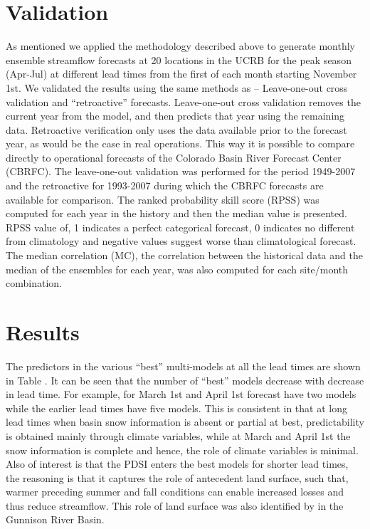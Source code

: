 \documentclass[final,5p,times,twocolumn,authoryear]{elsarticle}
\begin{document}
\section{Validation}

As mentioned we applied the methodology described above to generate monthly ensemble streamflow forecasts at 20 locations in the UCRB for the peak season (Apr-Jul) at different lead times from the first of each month starting November 1st. We validated the results using the same methods as \cite{Bracken:2010cw} -- Leave-one-out cross validation and ``retroactive'' forecasts. Leave-one-out cross validation removes the current year from the model, and then predicts that year using the remaining data. Retroactive verification only uses the data available prior to the forecast year, as would be the case in real operations. This way it is possible to compare directly to operational forecasts of the Colorado Basin River Forecast Center (CBRFC). The leave-one-out validation was performed for the period 1949-2007 and the retroactive for 1993-2007 during which the CBRFC forecasts are available for comparison.  The ranked probability skill score (RPSS) \cite{Wilks:1995ur} was computed for each year in the history and then the median value is presented. RPSS value of, 1 indicates a perfect categorical forecast, 0 indicates no different from climatology and negative values suggest worse than climatological forecast. The median correlation (MC), the correlation between the historical data and the median of the ensembles for each year,  was also computed for each site/month combination. 

\section{Results}

The predictors in the various ``best'' multi-models at all the lead times are shown in Table \label{tab:models}. It can be seen that the number of ``best'' models decrease with decrease in lead time. For example, for March 1st and April 1st forecast have two models while the earlier lead times have five models. This is consistent in that at long lead times when basin snow information is absent or partial at best, predictability is obtained mainly through climate variables, while at March and April 1st the snow information is complete and hence, the role of climate variables is minimal. Also of interest is that the PDSI enters the best models for shorter lead times, the reasoning is that it captures the role of antecedent land surface, such that, warmer preceding summer and fall conditions can enable increased losses and thus reduce streamflow. This role of land surface was also identified by \cite{Regonda2006} in the Gunnison River Basin.
\end{document}

